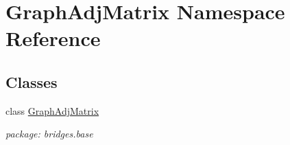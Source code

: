\hypertarget{namespace_graph_adj_matrix}{}\section{Graph\+Adj\+Matrix Namespace Reference}
\label{namespace_graph_adj_matrix}
\subsection*{Classes}
\begin{DoxyCompactItemize}
\item 
class \hyperlink{class_graph_adj_matrix_1_1_graph_adj_matrix}{Graph\+Adj\+Matrix}
\begin{DoxyCompactList}\small\item\em package\+: bridges.\+base \end{DoxyCompactList}\end{DoxyCompactItemize}
